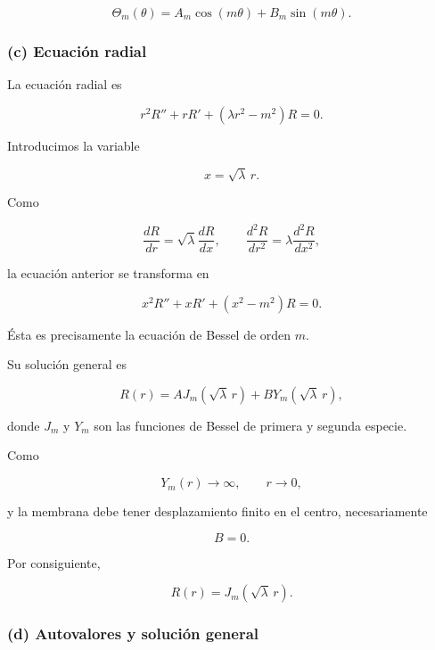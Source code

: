 \documentclass[12pt]{article}
\begin{document}
\begin{equation}
\boxed{
\Theta_m(\theta)
=
A_m\cos(m\theta)
+
B_m\sin(m\theta).
}
\end{equation}

\subsubsection*{(c) Ecuación radial}

La ecuación radial es

\begin{equation}
r^2R''
+rR'
+
(\lambda r^2-m^2)R=0.
\end{equation}

Introducimos la variable

\[
x=\sqrt{\lambda}\,r.
\]

Como

\[
\frac{dR}{dr}
=
\sqrt{\lambda}
\frac{dR}{dx},
\qquad
\frac{d^2R}{dr^2}
=
\lambda
\frac{d^2R}{dx^2},
\]

la ecuación anterior se transforma en

\begin{equation}
x^2R''
+xR'
+
(x^2-m^2)R=0.
\end{equation}

Ésta es precisamente la ecuación de Bessel de orden $m$.

Su solución general es

\begin{equation}
\boxed{
R(r)
=
A
J_m(\sqrt{\lambda}\,r)
+
B
Y_m(\sqrt{\lambda}\,r),
}
\end{equation}

donde $J_m$ y $Y_m$ son las funciones de Bessel de primera y segunda especie.

Como

\[
Y_m(r)\rightarrow\infty,
\qquad
r\rightarrow0,
\]

y la membrana debe tener desplazamiento finito en el centro, necesariamente

\[
B=0.
\]

Por consiguiente,

\begin{equation}
\boxed{
R(r)
=
J_m(\sqrt{\lambda}\,r).
}
\end{equation}

\subsubsection*{(d) Autovalores y solución general}
\end{document}
